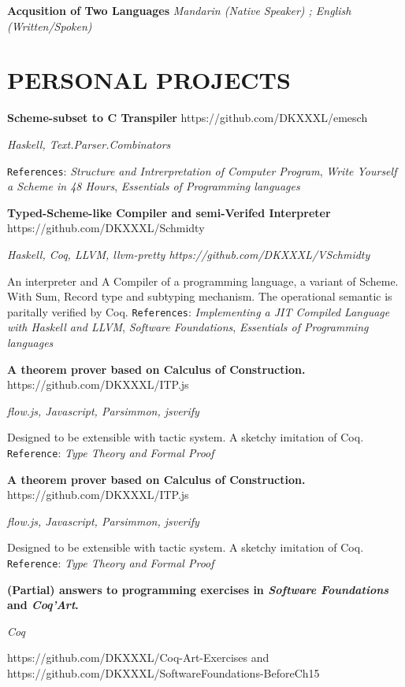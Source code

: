 \documentclass[fontsize=11pt]{article}
\newcommand{\NewPart}[1]{\section*{\uppercase{#1}}}
\newcommand{\SkillEntry}[2]{       %
    \noindent \textbf{#1} \hfill      %
        \noindent \textit{#2} \par        %
}
\newcommand{\EducationEntry}[4]{
    \noindent \textbf{#1} \hfill      %
    \colorbox{Black}{ 
      \parbox{11em}{
      \centering \color{White}#2}} \par  %
    \noindent \textit{#3} \par        %
    \noindent\hangindent=0em\hangafter=0 \small #4 %
    \normalsize \par}
\newcommand{\ProjectEntry}[4]{         %
    \noindent \textbf{#1}  \hfill {#2} \par
    \noindent \textit{#3} \par
    \noindent \small #4 %
    \normalsize \par}
\begin{document}
\SkillEntry{Acqusition of Two Languages}{
    Mandarin (Native Speaker) ; English (Written/Spoken)
}

\NewPart{Personal Projects}{}

\ProjectEntry{Scheme-subset to C Transpiler}{https://github.com/DKXXXL/emesch}
{Haskell, Text.Parser.Combinators}
{ \texttt{References}: \textit{Structure and Intrerpretation of Computer Program}, \textit{Write Yourself a Scheme in 48 Hours}, \textit{Essentials of Programming languages}}

\ProjectEntry{Typed-Scheme-like  Compiler and semi-Verifed Interpreter }{https://github.com/DKXXXL/Schmidty}
{Haskell, Coq, LLVM, llvm-pretty \hfill {https://github.com/DKXXXL/VSchmidty}}
{An interpreter and A Compiler of a programming language, a variant of Scheme. With Sum, Record type and subtyping mechanism.  
The operational semantic is paritally verified by Coq. 
\texttt{References}: \textit{Implementing a JIT Compiled Language with Haskell and LLVM}, \textit{Software Foundations}, \textit{Essentials of Programming languages} }

\ProjectEntry{A theorem prover based on Calculus of Construction.}{https://github.com/DKXXXL/ITP.js}
{flow.js, Javascript, Parsimmon, jsverify }
{Designed to be extensible with tactic system. 
A sketchy imitation of Coq. 
\texttt{Reference}: \textit{Type Theory and Formal Proof}
}

\ProjectEntry{A theorem prover based on Calculus of Construction.}{https://github.com/DKXXXL/ITP.js}
{flow.js, Javascript, Parsimmon, jsverify }
{Designed to be extensible with tactic system. 
A sketchy imitation of Coq. 
\texttt{Reference}: \textit{Type Theory and Formal Proof}
}

\ProjectEntry{(Partial) answers to programming exercises in \textit{Software Foundations} and \textit{Coq’Art}.}{}{Coq}{
https://github.com/DKXXXL/Coq-Art-Exercises
and https://github.com/DKXXXL/SoftwareFoundations-BeforeCh15
}

\ 
\end{document}
